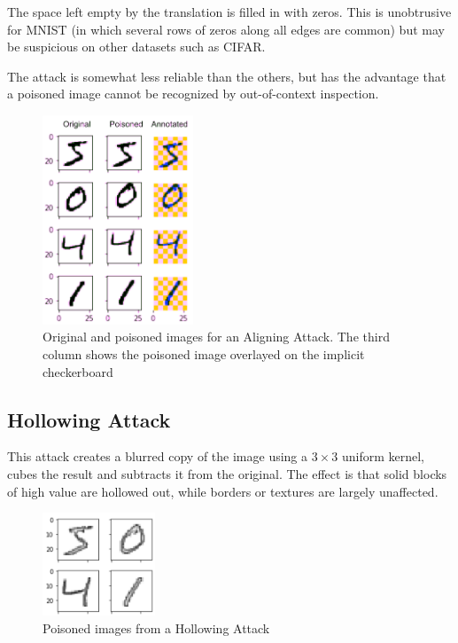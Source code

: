 \documentclass[letterpaper, 10 pt, conference]{ieeeconf}  %
\begin{document}
The space left empty by the translation is filled in with zeros.  This
is unobtrusive for MNIST (in which several rows of zeros along all
edges are common) but may be suspicious on other datasets such as CIFAR.

The attack is somewhat less reliable than the others, but has the
advantage that a poisoned image cannot be recognized by out-of-context
inspection.

\begin{figure}[h]
\centering
\includegraphics[width=0.4\textwidth]{aligner.png}
\caption{Original and poisoned images for an Aligning Attack.  The third column shows the poisoned image overlayed on the implicit checkerboard}
\end{figure}

\subsection{Hollowing Attack}

This attack creates a blurred copy of the image using a $3\times 3$
uniform kernel, cubes the result and subtracts it from the original.
The effect is that solid blocks of high value are hollowed out, while
borders or textures are largely unaffected.

\begin{figure}[h]
\centering
\includegraphics[width=0.3\textwidth]{hollow.png}
\caption{Poisoned images from a Hollowing Attack}
\end{figure}
\end{document}
